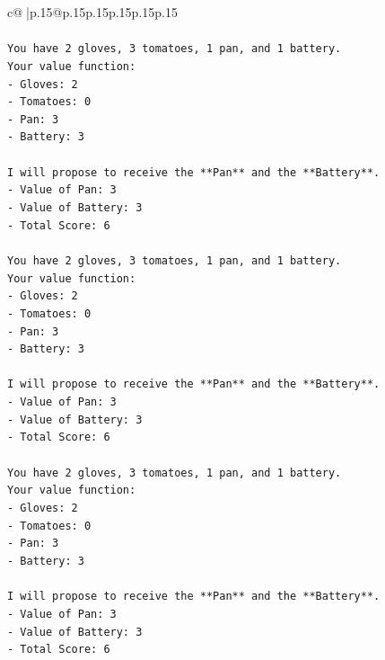 \documentclass{article}
\begin{document}
{\begin{supertabular}{c@{$\;$}|p{.15\linewidth}@{}p{.15\linewidth}p{.15\linewidth}p{.15\linewidth}p{.15\linewidth}p{.15\linewidth}}
{{{\\ 
\\ 
\texttt{You have 2 gloves, 3 tomatoes, 1 pan, and 1 battery.} \\
\texttt{Your value function:} \\
\texttt{{-} Gloves: 2} \\
\texttt{{-} Tomatoes: 0} \\
\texttt{{-} Pan: 3} \\
\texttt{{-} Battery: 3} \\
\\ 
\texttt{I will propose to receive the **Pan** and the **Battery**.} \\
\texttt{{-} Value of Pan: 3} \\
\texttt{{-} Value of Battery: 3} \\
\texttt{{-} Total Score: 6} \\
\\ 
\texttt{You have 2 gloves, 3 tomatoes, 1 pan, and 1 battery.} \\
\texttt{Your value function:} \\
\texttt{{-} Gloves: 2} \\
\texttt{{-} Tomatoes: 0} \\
\texttt{{-} Pan: 3} \\
\texttt{{-} Battery: 3} \\
\\ 
\texttt{I will propose to receive the **Pan** and the **Battery**.} \\
\texttt{{-} Value of Pan: 3} \\
\texttt{{-} Value of Battery: 3} \\
\texttt{{-} Total Score: 6} \\
\\ 
\texttt{You have 2 gloves, 3 tomatoes, 1 pan, and 1 battery.} \\
\texttt{Your value function:} \\
\texttt{{-} Gloves: 2} \\
\texttt{{-} Tomatoes: 0} \\
\texttt{{-} Pan: 3} \\
\texttt{{-} Battery: 3} \\
\\ 
\texttt{I will propose to receive the **Pan** and the **Battery**.} \\
\texttt{{-} Value of Pan: 3} \\
\texttt{{-} Value of Battery: 3} \\
\texttt{{-} Total Score: 6} \\
}}}
\end{supertabular}}
\end{document}

